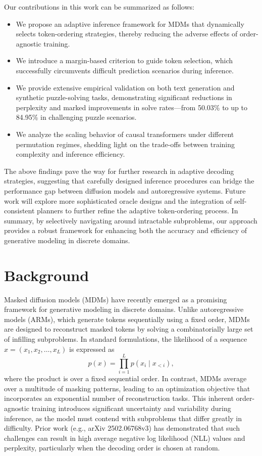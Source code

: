 \documentclass{article}
\begin{document}
Our contributions in this work can be summarized as follows:
\begin{itemize}
    \item We propose an adaptive inference framework for MDMs that dynamically selects token-ordering strategies, thereby reducing the adverse effects of order-agnostic training.
    \item We introduce a margin-based criterion to guide token selection, which successfully circumvents difficult prediction scenarios during inference.
    \item We provide extensive empirical validation on both text generation and synthetic puzzle-solving tasks, demonstrating significant reductions in perplexity and marked improvements in solve rates—from 50.03\% to up to 84.95\% in challenging puzzle scenarios.
    \item We analyze the scaling behavior of causal transformers under different permutation regimes, shedding light on the trade-offs between training complexity and inference efficiency.
\end{itemize}

The above findings pave the way for further research in adaptive decoding strategies, suggesting that carefully designed inference procedures can bridge the performance gap between diffusion models and autoregressive systems. Future work will explore more sophisticated oracle designs and the integration of self-consistent planners to further refine the adaptive token-ordering process. In summary, by selectively navigating around intractable subproblems, our approach provides a robust framework for enhancing both the accuracy and efficiency of generative modeling in discrete domains.

\section{Background}
Masked diffusion models (MDMs) have recently emerged as a promising framework for generative modeling in discrete domains. Unlike autoregressive models (ARMs), which generate tokens sequentially using a fixed order, MDMs are designed to reconstruct masked tokens by solving a combinatorially large set of infilling subproblems. In standard formulations, the likelihood of a sequence \( x = (x_1, x_2, \dots, x_L) \) is expressed as
\[
p(x) = \prod_{i=1}^{L} p(x_i \mid x_{<i}),
\]
where the product is over a fixed sequential order. In contrast, MDMs average over a multitude of masking patterns, leading to an optimization objective that incorporates an exponential number of reconstruction tasks. This inherent order-agnostic training introduces significant uncertainty and variability during inference, as the model must contend with subproblems that differ greatly in difficulty. Prior work (e.g., arXiv 2502.06768v3) has demonstrated that such challenges can result in high average negative log likelihood (NLL) values and perplexity, particularly when the decoding order is chosen at random.
\end{document}
